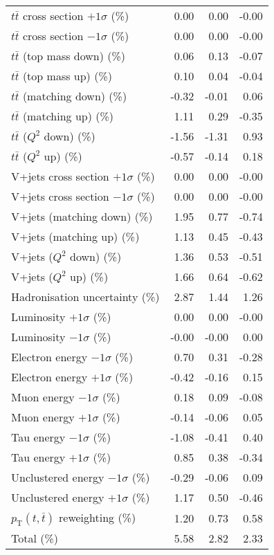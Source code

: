 \begin{table}[htbp]
{\begin{tabular}{lrrr}
$t\bar{t}$ cross section $+1\sigma$ (\%) & 0.00 & 0.00 & -0.00 \\ 
$t\bar{t}$ cross section $-1\sigma$ (\%) & 0.00 & 0.00 & -0.00 \\ 
$t\bar{t}$ (top mass down) (\%) & 0.06 & 0.13 & -0.07 \\ 
$t\bar{t}$ (top mass up) (\%) & 0.10 & 0.04 & -0.04 \\ 
$t\bar{t}$ (matching down) (\%) & -0.32 & -0.01 & 0.06 \\ 
$t\bar{t}$ (matching up) (\%) & 1.11 & 0.29 & -0.35 \\ 
$t\bar{t}$ ($Q^{2}$ down) (\%) & -1.56 & -1.31 & 0.93 \\ 
$t\bar{t}$ ($Q^{2}$ up) (\%) & -0.57 & -0.14 & 0.18 \\ 
V+jets cross section \ensuremath{+1\sigma} (\%) & 0.00 & 0.00 & -0.00 \\ 
V+jets cross section \ensuremath{-1\sigma} (\%) & 0.00 & 0.00 & -0.00 \\ 
V+jets (matching down) (\%) & 1.95 & 0.77 & -0.74 \\ 
V+jets (matching up) (\%) & 1.13 & 0.45 & -0.43 \\ 
V+jets ($Q^{2}$ down) (\%) & 1.36 & 0.53 & -0.51 \\ 
V+jets ($Q^{2}$ up) (\%) & 1.66 & 0.64 & -0.62 \\ 
Hadronisation uncertainty (\%) & 2.87 & 1.44 & 1.26 \\ 
Luminosity $+1\sigma$ (\%) & 0.00 & 0.00 & -0.00 \\ 
Luminosity $-1\sigma$ (\%) & -0.00 & -0.00 & 0.00 \\ 
Electron energy $-1\sigma$ (\%) & 0.70 & 0.31 & -0.28 \\ 
Electron energy $+1\sigma$ (\%) & -0.42 & -0.16 & 0.15 \\ 
Muon energy $-1\sigma$ (\%) & 0.18 & 0.09 & -0.08 \\ 
Muon energy $+1\sigma$ (\%) & -0.14 & -0.06 & 0.05 \\ 
Tau energy $-1\sigma$ (\%) & -1.08 & -0.41 & 0.40 \\ 
Tau energy $+1\sigma$ (\%) & 0.85 & 0.38 & -0.34 \\ 
Unclustered energy $-1\sigma$ (\%) & -0.29 & -0.06 & 0.09 \\ 
Unclustered energy $+1\sigma$ (\%) & 1.17 & 0.50 & -0.46 \\ 
$p_\mathrm{T}(t,\bar{t})$ reweighting (\%) & 1.20 & 0.73 & 0.58 \\ 
\hline 
Total (\%) & 5.58  & 2.82  & 2.33 \\ 
\hline 
\end{tabular}
}
\end{table}
